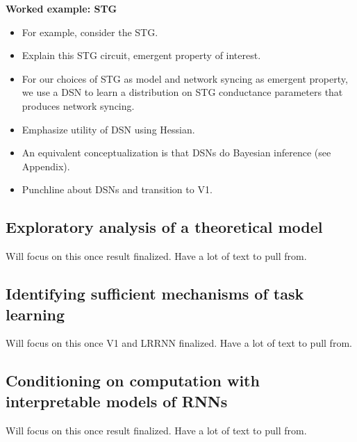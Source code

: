 \documentclass[11pt]{article}
\begin{document}
\textbf{Worked example: STG}
\begin{itemize}
\item For example, consider the STG.
\item Explain this STG circuit, emergent property of interest.
\item  For our choices of STG as model and network syncing as emergent property, we use a DSN to learn a distribution on STG conductance parameters that produces network syncing.  
\item Emphasize utility of DSN using Hessian.
\item An equivalent conceptualization is that DSNs do Bayesian inference (see Appendix).
\item Punchline about DSNs and transition to V1.
\end{itemize}

\subsection{Exploratory analysis of a theoretical model}
Will focus on this once result finalized.  Have a lot of text to pull from.

\subsection{Identifying sufficient mechanisms of task learning}
Will focus on this once V1 and LRRNN finalized.  Have a lot of text to pull from.

\subsection{Conditioning on computation with interpretable models of RNNs}
Will focus on this once result finalized.  Have a lot of text to pull from.
\end{document}
